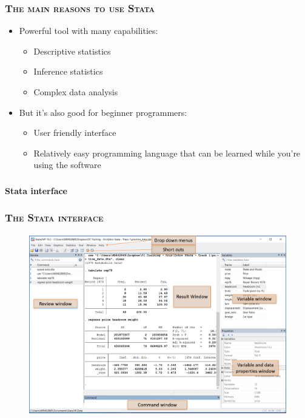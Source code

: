 \documentclass[10pt]{beamer}
\begin{document}
		\begin{frame}
			\frametitle{\textsc{The main reasons to use Stata}}
			\begin{itemize}
				 \item Powerful tool with many capabilities:
				
				\begin{itemize}
					\item Descriptive statistics
					
					\item Inference statistics
					
					\item Complex data analysis
					
				\end{itemize}
				
				 \item But it's also good for beginner programmers:
				
				\begin{itemize}
					\item User friendly interface
					
					\item Relatively easy programming language that can be learned while you're using the software
					
				\end{itemize}
			\end{itemize}
		\end{frame}	

		
	\begin{frame}
		\frametitle{\textsc{}}

		\begin{center}
			\Large \textbf{Stata interface}
		\end{center}
	\end{frame}
		
		
	\begin{frame}
		\frametitle{\textsc{The Stata interface}}
		
		\begin{figure}[H] 
		\centering
		\includegraphics[width=0.9\linewidth]{stata_interface}
		\end{figure}
	\end{frame}
\end{document}
